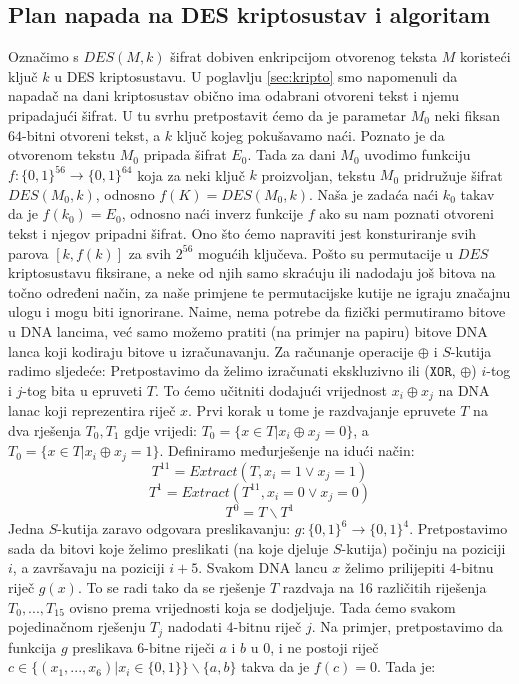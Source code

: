 \documentclass[a4paper,oneside,12pt]{memoir} %
\begin{document}
\begin{spacing}{1.5}
\subsection{Plan napada na DES kriptosustav i algoritam}
Označimo s $DES(M,k)$ šifrat dobiven enkripcijom otvorenog teksta $M$ koristeći ključ $k$ u DES kriptosustavu. U poglavlju \ref{sec:kripto} smo napomenuli da napadač na dani kriptosustav obično ima odabrani otvoreni tekst i njemu pripadajući šifrat. U tu svrhu pretpostavit ćemo da je parametar $M_0$ neki fiksan $64$-bitni otvoreni tekst, a $k$ ključ kojeg pokušavamo naći. Poznato je da otvorenom tekstu $M_0$ pripada šifrat $E_0$. Tada za dani $M_0$ uvodimo funkciju $f:\{0,1\}^{56} \to \{0,1\}^{64}$ koja za neki ključ $k$ proizvoljan, tekstu $M_0$ pridružuje šifrat $DES(M_0,k)$, odnosno $f(K)=DES(M_0,k)$. Naša je zadaća naći $k_0$ takav da je $f(k_0)=E_0$, odnosno naći inverz funkcije $f$ ako su nam poznati otvoreni tekst i njegov pripadni šifrat. Ono što ćemo napraviti jest konsturiranje svih parova $[k, f(k)]$ za svih $2^{56}$ mogućih ključeva. Pošto su permutacije u $DES$ kriptosustavu fiksirane, a neke od njih samo skraćuju ili nadodaju još bitova na točno određeni način, za naše primjene te permutacijske kutije ne igraju značajnu ulogu i mogu biti ignorirane. Naime, nema potrebe da  fizički permutiramo bitove u DNA lancima, već samo možemo pratiti (na primjer na papiru) bitove DNA lanca koji kodiraju bitove u izračunavanju. Za računanje operacije $\oplus$ i $S$-kutija radimo sljedeće:
Pretpostavimo da želimo izračunati ekskluzivno ili ($\mathtt{XOR}$, $\oplus$) $i$-tog i $j$-tog bita u epruveti $T$. To ćemo učitniti dodajući vrijednost $x_i \oplus x_j$ na DNA lanac koji reprezentira riječ $x$. Prvi korak u tome je razdvajanje epruvete $T$ na dva rješenja $T_0, T_1$ gdje vrijedi:
$T_0=\{x \in T| x_i \oplus x_j=0 \}$, a $T_0=\{x \in T| x_i \oplus x_j=1 \}$. Definiramo međurješenje na idući način:
\[T^{11}=Extract(T, x_i=1 \vee x_j=1)\]
\[T^{1}=Extract(T^{11}, x_i=0 \vee x_j=0)\]
\[T^{0}=T\backslash T^{1}\]
Jedna $S$-kutija zaravo odgovara preslikavanju: $g: \{0,1\}^6 \to \{0,1\}^4$. Pretpostavimo sada da bitovi koje želimo preslikati (na koje djeluje $S$-kutija) počinju na poziciji $i$, a završavaju na poziciji $i+5$. Svakom DNA lancu $x$ želimo prilijepiti $4$-bitnu riječ  $g(x)$. To se radi tako da se rješenje $T$ razdvaja na 16 različitih riješenja $T_0,...,T_{15}$ ovisno prema vrijednosti koja se dodjeljuje. Tada ćemo svakom pojedinačnom rješenju $T_j$ nadodati $4$-bitnu riječ $j$. Na primjer, pretpostavimo da funkcija $g$ preslikava $6$-bitne riječi $a$ i $b$ u $0$, i ne postoji riječ $c \in \{(x_1,...,x_6)| x_i \in \{0,1\}\}\backslash \{a,b\}$ takva da je $f(c)=0$. Tada je:

\end{spacing}
\end{document}
